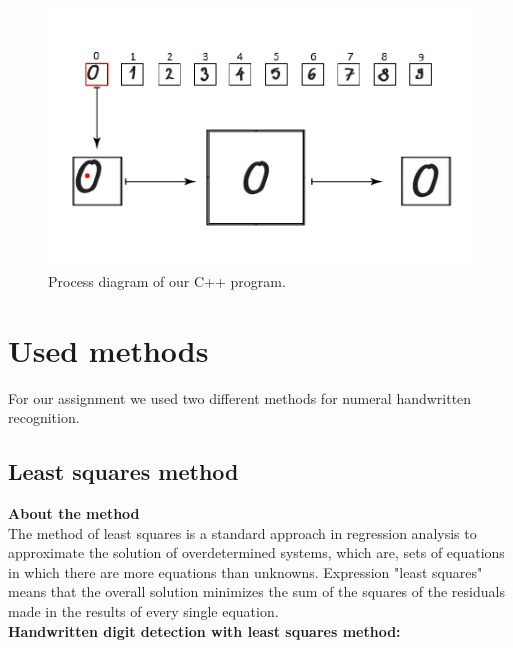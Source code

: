 \documentclass[12pt]{article}
\begin{document}
\newpage
\begin{figure}[h]
	\centering
	\includegraphics[clip,scale=0.9]{images/diagram.png}
	\caption[Process diagram of our C++ program]{Process diagram of our C++ program.}
	
\end{figure}



\newpage
\section{Used methods}
For our assignment we used two different methods for numeral handwritten recognition.
\subsection{Least squares method}
\textbf{About the method}\\
The method of least squares is a standard approach in regression analysis to approximate the solution of overdetermined systems, which are, sets of equations in which there are more equations than unknowns. Expression "least squares" means that the overall solution minimizes the sum of the squares of the residuals made in the results of every single equation.\\
\newline
\textbf{Handwritten digit detection with least squares method:}\\
\end{document}
